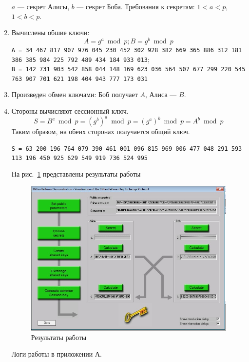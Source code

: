 \documentclass[a4paper, 14pt]{extarticle}
\begin{document}
\begin{enumerate}
        $a$ --- секрет Алисы, $b$ --- секрет Боба. Требования к секретам: $1 < a < p$, $1 < b < p$.

    \item Вычислены обшие ключи:
        \[ A = g^a \bmod p; B = g^b \bmod p \]
        \texttt{A = 34 467 817 907 976 045 230 452 302 928 382 669 365 886 312 181 386 385 984 225 792 489 434 184 933 013};\\
        \texttt{B = 142 731 903 542 858 044 148 169 623 036 564 507 677 299 220 545 763 907 701 621 198 404 943 777 173 031} 

    \item Произведен обмен ключами: Боб получает $A$, Алиса --- $B$.
    \item Стороны вычисляют сессионный ключ.
        \[ S = B^a \bmod p = {(g^b)}^a \bmod p = {(g^a)}^b \bmod p = A^b \bmod p \] 
        Таким образом, на обеих сторонах получается общий ключ.

        \texttt{S = 63 200 196 764 079 390 461 001 096 815 969 006 477 048 291 593 113 196 450 925 629 549 919 736 524 995}

        На рис.~\ref{img:a:2} представлены результаты работы
        \begin{figure}[h]
            \centering
            \includegraphics[width=\textwidth]{img/S002.jpg}
            \caption{Результаты работы}%
            \label{img:a:2}
        \end{figure}

        Логи работы в приложении А.

\end{enumerate}
\end{document}
